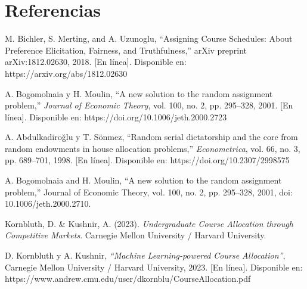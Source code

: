 \documentclass{article}
\begin{document}
\section{Referencias}
\renewcommand{\refname}{}
\begin{thebibliography}{9}

 \label{ref:BPS} M. Bichler, S. Merting, and A. Uzunoglu, 
“Assigning Course Schedules: About Preference Elicitation, Fairness, and Truthfulness,” 
arXiv preprint arXiv:1812.02630, 2018. [En línea]. Disponible en: 
https://arxiv.org/abs/1812.02630

 \label{ref:RSD1} 
A. Bogomolnaia y H. Moulin, 
“A new solution to the random assignment problem,” 
\textit{Journal of Economic Theory}, vol. 100, no. 2, pp. 295–328, 2001. [En línea]. Disponible en: https://doi.org/10.1006/jeth.2000.2723

 \label{ref:RSD2} 
A. Abdulkadiroğlu y T. Sönmez, 
“Random serial dictatorship and the core from random endowments in house allocation problems,” 
\textit{Econometrica}, vol. 66, no. 3, pp. 689–701, 1998. [En línea]. Disponible en: https://doi.org/10.2307/2998575

 \label{ref:PBS} A. Bogomolnaia and H. Moulin, “A new solution to the random 
assignment problem,” Journal of Economic Theory, vol. 100, no. 2, pp. 295–328, 2001, doi: 
10.1006/jeth.2000.2710.

 \label{ref:Mercados} Kornbluth, D. \& Kushnir, A. (2023). \textit{Undergraduate Course Allocation through 
Competitive Markets}. Carnegie Mellon University / Harvard University.

 \label{ref:AprendizajeAutomatico} 
D. Kornbluth y A. Kushnir, 
\textit{“Machine Learning-powered Course Allocation”}, 
Carnegie Mellon University / Harvard University, 2023. [En línea]. Disponible en: https://www.andrew.cmu.edu/user/dkornblu/CourseAllocation.pdf




\end{thebibliography}
\end{document}
